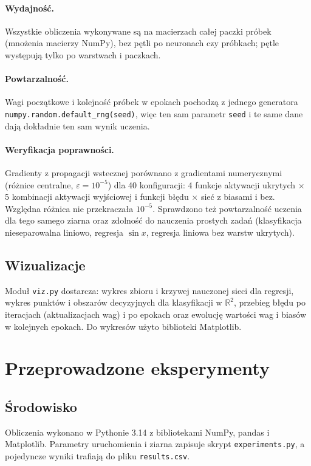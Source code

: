 \documentclass[11pt,a4paper]{article}
\begin{document}
	\paragraph{Wydajność.} Wszystkie obliczenia wykonywane są na macierzach całej paczki próbek (mnożenia macierzy NumPy), bez pętli po neuronach czy próbkach; pętle występują tylko po warstwach i paczkach.
	
	\paragraph{Powtarzalność.} Wagi początkowe i kolejność próbek w epokach pochodzą z jednego generatora \texttt{numpy.random.default\_rng(seed)}, więc ten sam parametr \texttt{seed} i te same dane dają dokładnie ten sam wynik uczenia.
	
	\paragraph{Weryfikacja poprawności.} Gradienty z propagacji wstecznej porównano z gradientami numerycznymi (różnice centralne, $\varepsilon=10^{-5}$) dla 40 konfiguracji: 4 funkcje aktywacji ukrytych $\times$ 5 kombinacji aktywacji wyjściowej i funkcji błędu $\times$ sieć z biasami i bez. Względna różnica nie przekraczała $10^{-5}$. Sprawdzono też powtarzalność uczenia dla tego samego ziarna oraz zdolność do nauczenia prostych zadań (klasyfikacja nieseparowalna liniowo, regresja $\sin x$, regresja liniowa bez warstw ukrytych).
	
	\subsection{Wizualizacje}
	Moduł \texttt{viz.py} dostarcza: wykres zbioru i krzywej nauczonej sieci dla regresji, wykres punktów i obszarów decyzyjnych dla klasyfikacji w $\mathbb{R}^2$, przebieg błędu po iteracjach (aktualizacjach wag) i po epokach oraz ewolucję wartości wag i biasów w kolejnych epokach. Do wykresów użyto biblioteki Matplotlib.
	
	\section{Przeprowadzone eksperymenty}
	
	\subsection{Środowisko}
	Obliczenia wykonano w Pythonie 3.14 z bibliotekami NumPy, pandas i Matplotlib. Parametry uruchomienia i ziarna zapisuje skrypt \texttt{experiments.py}, a pojedyncze wyniki trafiają do pliku \texttt{results.csv}.
	
\end{document}
